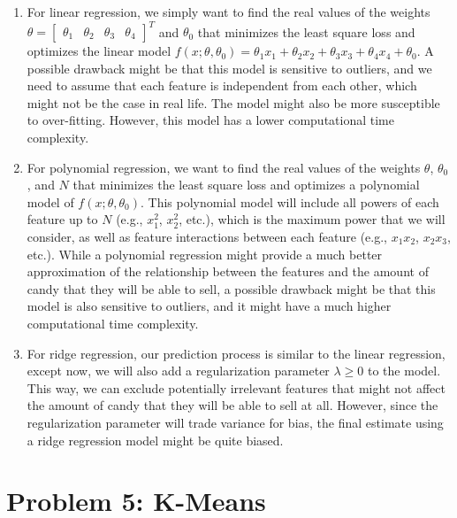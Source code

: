 \documentclass[11pt,fancychapters]{article}
\begin{document}
\begin{enumerate}[label=\textbf{\arabic*.}]
	\item For linear regression, we simply want to find the real values of the weights $\theta = \begin{bmatrix}\theta_1 & \theta_2 & \theta_3 & \theta_4\end{bmatrix}^T$ and $\theta_0$ that minimizes the least square loss and optimizes the linear model $f(x;\theta,\theta_0) = \theta_1x_1 + \theta_2x_2 + \theta_3x_3 + \theta_4x_4 + \theta_0$. A possible drawback might be that this model is sensitive to outliers, and we need to assume that each feature is independent from each other, which might not be the case in real life. The model might also be more susceptible to over-fitting. However, this model has a lower computational time complexity.
	
	\item For polynomial regression, we want to find the real values of the weights $\theta$, $\theta_0$, and $N$ that minimizes the least square loss and optimizes a polynomial model of $f(x;\theta,\theta_0)$. This polynomial model will include all powers of each feature up to $N$ (e.g., $x_1^2$, $x_2^2$, etc.), which is the maximum power that we will consider, as well as feature interactions between each feature (e.g., $x_1x_2$, $x_2x_3$, etc.). While a polynomial regression might provide a much better approximation of the relationship between the features and the amount of candy that they will be able to sell, a possible drawback might be that this model is also sensitive to outliers, and it might have a much higher computational time complexity.
	
	\item For ridge regression, our prediction process is similar to the linear regression, except now, we will also add a regularization parameter $\lambda \geq 0$ to the model. This way, we can exclude potentially irrelevant features that might not affect the amount of candy that they will be able to sell at all. However, since the regularization parameter will trade variance for bias, the final estimate using a ridge regression model might be quite biased.
\end{enumerate}

\section*{Problem 5: K-Means}
\end{document}
